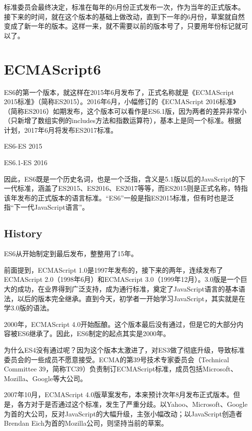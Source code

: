 标准委员会最终决定，标准在每年的6月份正式发布一次，作为当年的正式版本。接下来的时间，就在这个版本的基础上做改动，直到下一年的6月份，草案就自然变成了新一年的版本。这样一来，就不需要以前的版本号了，只要用年份标记就可以了。

\section{ECMAScript6}


ES6的第一个版本，就这样在2015年6月发布了，正式名称就是《ECMAScript 2015标准》（简称ES2015）。2016年6月，小幅修订的《ECMAScript 2016标准》（简称ES2016）如期发布，这个版本可以看作是ES6.1版，因为两者的差异非常小（只新增了数组实例的includes方法和指数运算符），基本上是同一个标准。根据计划，2017年6月将发布ES2017标准。

\begin{compactitem}
\item ES6-ES 2015
\item ES6.1-ES 2016
\end{compactitem}



因此，ES6既是一个历史名词，也是一个泛指，含义是5.1版以后的JavaScript的下一代标准，涵盖了ES2015、ES2016、ES2017等等，而ES2015则是正式名称，特指该年发布的正式版本的语言标准。“ES6”一般是指ES2015标准，但有时也是泛指“下一代JavaScript语言”。



\subsection{History}

ES6从开始制定到最后发布，整整用了15年。

前面提到，ECMAScript 1.0是1997年发布的，接下来的两年，连续发布了ECMAScript 2.0（1998年6月）和ECMAScript 3.0（1999年12月）。3.0版是一个巨大的成功，在业界得到广泛支持，成为通行标准，奠定了JavaScript语言的基本语法，以后的版本完全继承。直到今天，初学者一开始学习JavaScript，其实就是在学3.0版的语法。

2000年，ECMAScript 4.0开始酝酿。这个版本最后没有通过，但是它的大部分内容被ES6继承了。因此，ES6制定的起点其实是2000年。

为什么ES4没有通过呢？因为这个版本太激进了，对ES3做了彻底升级，导致标准委员会的一些成员不愿意接受。ECMA的第39号技术专家委员会（Technical Committee 39，简称TC39）负责制订ECMAScript标准，成员包括Microsoft、Mozilla、Google等大公司。

2007年10月，ECMAScript 4.0版草案发布，本来预计次年8月发布正式版本。但是，各方对于是否通过这个标准，发生了严重分歧。以Yahoo、Microsoft、Google为首的大公司，反对JavaScript的大幅升级，主张小幅改动；以JavaScript创造者Brendan Eich为首的Mozilla公司，则坚持当前的草案。

